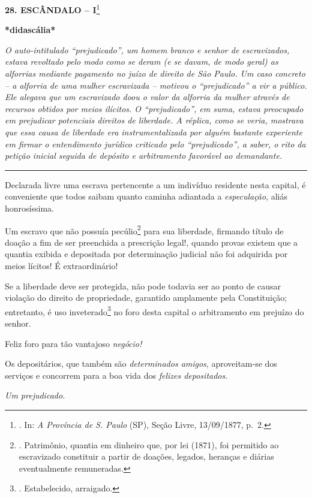 \textbf{28. ESCÂNDALO -- I}\footnote{. In: \emph{A Província de S.
  Paulo} (SP), Seção Livre, 13/09/1877, p.~2.}

\textbf{*didascália*}

\emph{O auto-intitulado ``prejudicado'', um homem branco e senhor de
escravizados, estava revoltado pelo modo como se deram (e se davam, de
modo geral) as alforrias mediante pagamento no juízo de direito de São
Paulo. Um caso concreto -- a alforria de uma mulher escravizada --
motivou o ``prejudicado'' a vir a público. Ele alegava que um
escravizado doou o valor da alforria da mulher através de recursos
obtidos por meios ilícitos. O ``prejudicado'', em suma, estava
preocupado em prejudicar potenciais direitos de liberdade. A réplica,
como se veria, mostrava que essa causa de liberdade era
instrumentalizada por alguém bastante experiente em firmar o
entendimento jurídico criticado pelo ``prejudicado'', a saber, o rito da
petição inicial seguida de depósito e arbitramento favorável ao
demandante.}

\begin{center}\rule{0.5\linewidth}{\linethickness}\end{center}

Declarada livre uma escrava pertencente a um indivíduo residente nesta
capital, é conveniente que todos saibam quanto caminha adiantada a
\emph{especulação}, aliás honrosíssima.

Um escravo que não possuía pecúlio\footnote{. Patrimônio, quantia em
  dinheiro que, por lei (1871), foi permitido ao escravizado constituir
  a partir de doações, legados, heranças e diárias eventualmente
  remuneradas.} para sua liberdade, firmando título de doação a fim de
ser preenchida a prescrição legal!, quando provas existem que a quantia
exibida e depositada por determinação judicial não foi adquirida por
meios lícitos! É extraordinário!

Se a liberdade deve ser protegida, não pode todavia ser ao ponto de
causar violação do direito de propriedade, garantido amplamente pela
Constituição; entretanto, é uso inveterado\footnote{. Estabelecido,
  arraigado.} no foro desta capital o arbitramento em prejuízo do
senhor.

Feliz foro para tão vantajoso \emph{negócio!}

Os depositários, que também são \emph{determinados amigos},
aproveitam-se dos serviços e concorrem para a boa vida dos \emph{felizes
depositados}.

\emph{Um prejudicado.}

